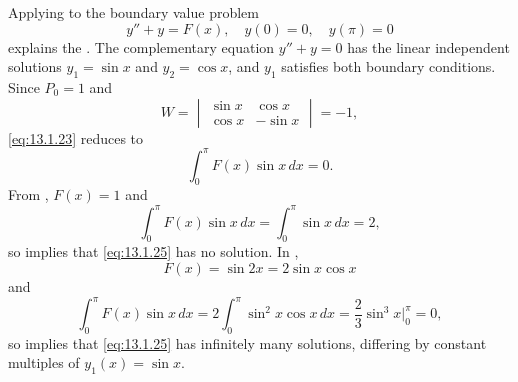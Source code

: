 \begin{example}\label{example:13.1.7}
Applying  to the boundary value problem
\begin{equation} \label{eq:13.1.25}
y''+y=F(x),\quad y(0)=0,\quad y(\pi)=0
\end{equation}
explains the  . The
complementary equation $y''+y=0$ has the linear independent solutions
$y_{1}=\sin x$ and $y_{2}=\cos x$, and $y_{1}$ satisfies both boundary
conditions. Since $P_{0}=1$ and
\[
W=
\begin{vmatrix}
\sin x&\cos x \\\cos x&-\sin x
\end{vmatrix}=-1,
\]
\eqref{eq:13.1.23} reduces to
\[
\int_{0}^{\pi} F(x)\sin x\,dx=0.
\]
From , $F(x)=1$ and
\[
\int_{0}^{\pi} F(x)\sin x\,dx=\int_{0}^{\pi} \sin x\,dx=2,
\]
so   implies that \eqref{eq:13.1.25} has no
solution.  In ,
\[
F(x)=\sin 2x=2\sin x \cos x
\]
and
\[
\int_{0}^{\pi}F(x)\sin x\,dx=2\int_{0}^{\pi}\sin^{2}x\cos x\,dx
=\frac{2}{3}\sin^{3}x\bigg|_{0}^{\pi}=0,
\]
so  implies that \eqref{eq:13.1.25} has infinitely
many solutions, differing by constant multiples of $y_{1}(x)=\sin x$.
\end{example}

\exercises

